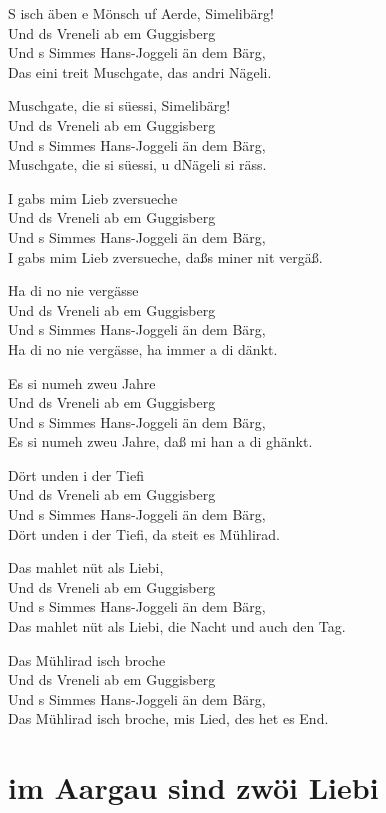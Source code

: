 \documentclass[
  letterpaper,
]{scrbook}
\begin{document}
S isch äben e Mönsch uf Aerde, Simelibärg!\\
Und ds Vreneli ab em Guggisberg\\
Und s Simmes Hans-Joggeli än dem Bärg,\\
Das eini treit Muschgate, das andri Nägeli.

Muschgate, die si süessi, Simelibärg!\\
Und ds Vreneli ab em Guggisberg\\
Und s Simmes Hans-Joggeli än dem Bärg,\\
Muschgate, die si süessi, u d\textquotesingle Nägeli si räss.

I gabs mim Lieb z\textquotesingle versueche\\
Und ds Vreneli ab em Guggisberg\\
Und s Simmes Hans-Joggeli än dem Bärg,\\
I gabs mim Lieb z\textquotesingle versueche, daßs miner nit vergäß.

Ha di no nie vergässe\\
Und ds Vreneli ab em Guggisberg\\
Und s Simmes Hans-Joggeli än dem Bärg,\\
Ha di no nie vergässe, ha immer a di dänkt.

Es si numeh zweu Jahre\\
Und ds Vreneli ab em Guggisberg\\
Und s Simmes Hans-Joggeli än dem Bärg,\\
Es si numeh zweu Jahre, daß mi han a di ghänkt.

Dört unden i der Tiefi\\
Und ds Vreneli ab em Guggisberg\\
Und s Simmes Hans-Joggeli än dem Bärg,\\
Dört unden i der Tiefi, da steit es Mühlirad.

Das mahlet nüt als Liebi,\\
Und ds Vreneli ab em Guggisberg\\
Und s Simmes Hans-Joggeli än dem Bärg,\\
Das mahlet nüt als Liebi, die Nacht und auch den Tag.

Das Mühlirad isch broche\\
Und ds Vreneli ab em Guggisberg\\
Und s Simmes Hans-Joggeli än dem Bärg,\\
Das Mühlirad isch broche, mis Lied, des het es End.

\hypertarget{im-aargau-sind-zwuxf6i-liebi}{%
\chapter{im Aargau sind zwöi Liebi}\label{im-aargau-sind-zwuxf6i-liebi}}
\end{document}
